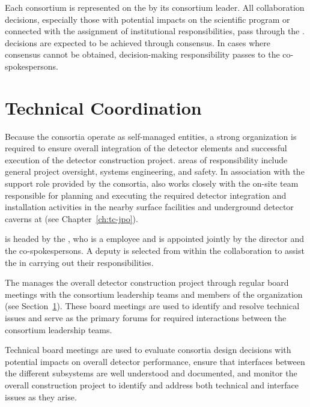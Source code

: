 Each consortium is represented on the   by its 
consortium leader.  All collaboration decisions, especially those with potential 
impacts on the  scientific program or connected with the assignment 
of institutional responsibilities, pass through the .   
decisions are expected to be achieved through consensus.  In cases where consensus 
cannot be obtained, decision-making responsibility passes to the co-spokespersons.

\section{Technical Coordination}
\label{sec:tc}

Because the consortia operate as self-managed entities, a strong
 organization is required to ensure overall integration 
of the detector elements and successful execution of the detector
construction project.   areas of responsibility include 
general project oversight, systems engineering,  
and safety.  In association with the support role provided by 
the consortia,  also works closely with the on-site 
team responsible for planning and executing the required 
detector integration and installation activities in the nearby 
surface facilities and underground detector caverns at  
(see Chapter~\ref{ch:tc-jpo}).  

 is headed by the , who is a 
employee and is appointed jointly by the  director and 
the  co-spokespersons.  A deputy  
is selected from within the collaboration to assist the  
in carrying out their responsibilities.

The  manages the overall detector construction project
through regular board meetings with the consortium leadership teams and 
members of the  organization (see Section~\ref{sec:tc}).  
These board meetings are used to identify and resolve technical issues
and serve as the primary forums for required interactions between the 
consortium leadership teams.

Technical board meetings are used to evaluate consortia design
decisions with potential impacts on overall detector performance,
ensure that interfaces between the different subsystems are well
understood and documented, and monitor the overall construction
project to identify and address both technical and interface issues 
as they arise.

